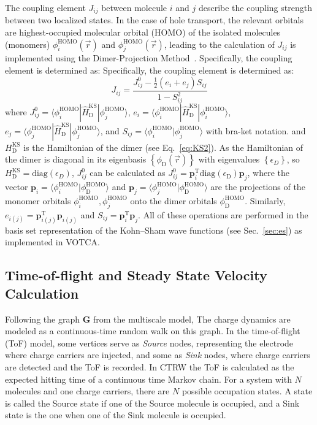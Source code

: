 \documentclass[%
 reprint,
 amsmath,amssymb,
 aps,
]{revtex4-2}
\begin{document}
The coupling element $J_{ij}$ between molecule $i$ and $j$ describe the coupling strength between two localized states. In the case of hole transport, the relevant orbitals are highest-occupied molecular orbital (HOMO) of the isolated molecules (monomers) $\phi^\text{HOMO}_i(\vec{r})$ and $\phi^\text{HOMO}_j(\vec{r})$, 
leading to the calculation of $J_{ij}$ is implemented using the Dimer-Projection Method~\cite{baumeier_density_2010}. Specifically, the coupling element is determined as:
Specifically, the coupling element is determined as: 
%
\begin{equation}
    J_{ij} = \frac{ J^0_{ij}- \frac{1}{2}(e_i+e_j) S_{ij} }{ 1- S_{ij}^2 }
    \label{equ:JAB}
\end{equation}
%
where $J^0_{ij} = \langle \phi^\text{HOMO}_i | \hat{H}^\text{KS}_\text{D} | \phi^\text{HOMO}_j \rangle $, $e_i = \langle \phi^\text{HOMO}_i | \hat{H}^\text{KS}_\text{D} | \phi^\text{HOMO}_i \rangle $, $e_j = \langle \phi^\text{HOMO}_j | \hat{H}^\text{KS}_\text{D} | \phi^\text{HOMO}_j \rangle $, and $S_{ij}=\langle \phi^\text{HOMO}_i | \phi^\text{HOMO}_j \rangle $ with bra-ket notation. 
and $H^\text{KS}_\text{D}$ is the Hamiltonian of the dimer (see Eq.~\ref{eq:KS2}). 
As the Hamiltonian of the dimer is diagonal in its eigenbasis $\left\{ \phi_\text{D}(\vec{r})\right\}$ with eigenvalues $\left\{ \epsilon_D\right\}$, so $H^\text{KS}_\text{D} = \text{diag}(\epsilon_D)$, $J^0_{ij}$ can be calculated as $J^0_{ij} = \mathbf{p}_i^\text{T} \text{diag}(\epsilon_\text{D}) \mathbf{p}_j$,  where the vector $\mathbf{p}_i = \langle \phi_i^\text{HOMO} | \phi^\text{HOMO}_\text{D} \rangle$ and $\mathbf{p}_j = \langle \phi_j^\text{HOMO} | \phi_\text{D}^\text{HOMO} \rangle$ are the projections of the monomer orbitals $\phi_i^\text{HOMO}, \phi_j^\text{HOMO}$ onto the dimer orbitals $\phi^\text{HOMO}_\text{D}$. Similarly, $e_{i(j)} = \mathbf{p}_{i(j)}^\text{T} \mathbf{p}_{i(j)}$ and $S_{ij} =  \mathbf{p}_i^\text{T} \mathbf{p}_j$. All  of these operations are performed in the basis set representation of the Kohn--Sham wave functions (see Sec.~\ref{sec:es}) as implemented in VOTCA.
\subsection{Time-of-flight and Steady State Velocity Calculation}
Following the graph $\mathbf{G}$ from the multiscale model,
The charge dynamics are modeled as a continuous-time random walk on this graph. In the time-of-flight (ToF) model, some vertices serve as \textit{Source} nodes, representing the electrode where charge carriers are injected, and some as \textit{Sink} nodes, where charge carriers are detected and the ToF is recorded.
In CTRW the ToF is calculated as the expected hitting time of a continuous time Markov chain.
For a system with $N$ molecules and one charge carriers, there are $N$ possible occupation states. A state is called the Source state if one of the Source molecule is occupied, and a Sink state is the one when one of the Sink molecule is occupied.
\end{document}
